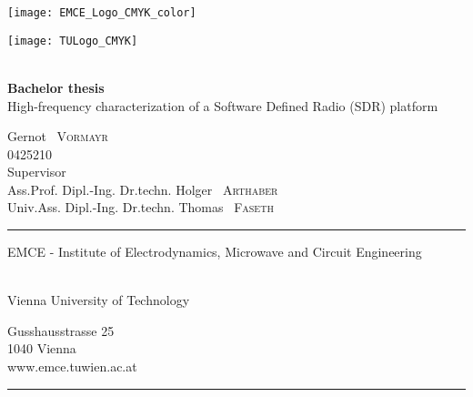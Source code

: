 \documentclass[12pt,a4paper,parskip=full]{scrreprt}
\begin{document}
\begin{titlepage}
    \enlargethispage{1cm}
    \centering
    \begin{minipage}{0.49\textwidth}
        \texttt{[image: EMCE\_Logo\_CMYK\_color]}
    \end{minipage}
    \begin{minipage}{0.49\textwidth}
        \flushright
        \texttt{[image: TULogo\_CMYK]}
    \end{minipage}\\
    \vspace*{5cm}
    {\Huge \textbf{Bachelor thesis}}\\
    \vspace*{1cm}
    {\Large High-frequency characterization of a Software Defined Radio (SDR) platform}

    \vspace*{2cm}
    {\large Gernot ~\textsc{Vormayr} ~\\ 0425210 } ~\\ 

    \vfill
    {Supervisor} ~\\\vspace*{0.1cm}
    {Ass.Prof. Dipl.-Ing. Dr.techn. \large Holger ~\textsc{Arthaber}} ~\\
    {Univ.Ass. Dipl.-Ing. Dr.techn. \large Thomas ~\textsc{Faseth}}
    \vspace*{2cm}

    \rule{\textwidth}{0.4pt}
    \begin{minipage}[t]{0.70\textwidth}
        \begin{large}
            EMCE - Institute of Electrodynamics, Microwave and Circuit Engineering
        \end{large}\\
        Vienna University of Technology
    \end{minipage}
    \hspace{1pt}
    \begin{minipage}[t]{0.27\textwidth}
        Gusshausstrasse 25\\
        1040 Vienna\\
        www.emce.tuwien.ac.at
    \end{minipage}
    \vspace*{-3pt}
    \rule{\textwidth}{0.4pt}
    \clearpage
\end{titlepage}

\tableofcontents
\end{document}
